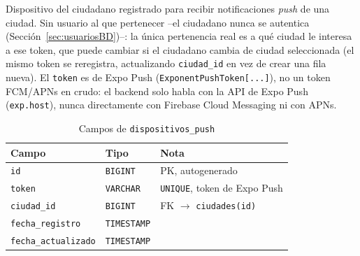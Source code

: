 Dispositivo del ciudadano registrado para recibir notificaciones \emph{push} de una ciudad. Sin usuario al que pertenecer --el ciudadano nunca se autentica (Sección~\ref{sec:usuariosBD})--: la única pertenencia real es a qué ciudad le interesa a ese token, que puede cambiar si el ciudadano cambia de ciudad seleccionada (el mismo token se reregistra, actualizando \texttt{ciudad\_id} en vez de crear una fila nueva). El \texttt{token} es de Expo Push (\texttt{ExponentPushToken[...]}), no un token FCM/APNs en crudo: el backend solo habla con la API de Expo Push (\texttt{exp.host}), nunca directamente con Firebase Cloud Messaging ni con APNs.

\begin{table}[H]
\centering
\begin{tabular}{|l|l|p{7cm}|}
\hline
\textbf{Campo} & \textbf{Tipo} & \textbf{Nota} \\
\hline
\texttt{id} & \texttt{BIGINT} & PK, autogenerado \\
\hline
\texttt{token} & \texttt{VARCHAR} & \texttt{UNIQUE}, token de Expo Push \\
\hline
\texttt{ciudad\_id} & \texttt{BIGINT} & FK $\to$ \texttt{ciudades(id)} \\
\hline
\texttt{fecha\_registro} & \texttt{TIMESTAMP} &  \\
\hline
\texttt{fecha\_actualizado} & \texttt{TIMESTAMP} &  \\
\hline
\end{tabular}
\caption{Campos de \texttt{dispositivos\_push}}
\end{table}

